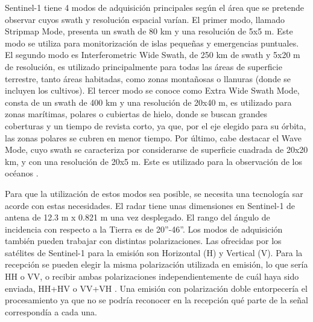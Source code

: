 \par Sentinel-1 tiene 4 modos de adquisición principales según el área que se pretende observar cuyos swath y resolución espacial varían. El primer modo, llamado Stripmap Mode, presenta un swath de 80 km y una resolución de 5x5 m. Este modo se utiliza para monitorización de islas pequeñas y emergencias puntuales. El segundo modo es Interferometric Wide Swath, de 250 km de swath y 5x20 m de resolución, es utilizado principalmente para todas las áreas de superficie terrestre, tanto áreas habitadas, como zonas montañosas o llanuras (donde se incluyen los cultivos). El tercer modo se conoce como Extra Wide Swath Mode, consta de un swath de 400 km y una resolución de 20x40 m, es utilizado para zonas marítimas, polares o cubiertas de hielo, donde se buscan grandes coberturas y un tiempo de revista corto, ya que, por el eje elegido para su órbita, las zonas polares se cubren en menor tiempo. Por último, cabe destacar el Wave Mode, cuyo swath se caracteriza por considerarse de superficie cuadrada de 20x20 km, y con una resolución de 20x5 m. Este es utilizado para la observación de los océanos \cite{EOSs1}. 
\\
\par Para que la utilización de estos modos sea posible, se necesita una tecnología \gls{sar} acorde con estas necesidades. El radar tiene unas dimensiones en Sentinel-1 de antena de 12.3 m x 0.821 m una vez desplegado. El rango del ángulo de incidencia con respecto a la Tierra es de 20”-46”. Los modos de adquisición también pueden trabajar con distintas polarizaciones. Las ofrecidas por los satélites de Sentinel-1 para la emisión son Horizontal (H) y Vertical (V). Para la recepción se pueden elegir la misma polarización utilizada en emisión, lo que sería HH o VV, o recibir ambas polarizaciones independientemente de cuál haya sido enviada, HH+HV o VV+VH \cite{EOSs1}. Una emisión con polarización doble entorpecería el procesamiento ya que no se podría reconocer en la recepción qué parte de la señal correspondía a cada una. 



